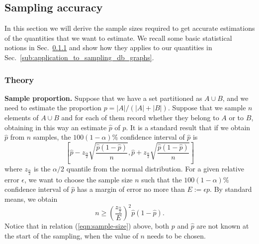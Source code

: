 \documentclass[a4paper,11pt]{article}
\newcommand{\alex}[1]{{\color{blue}{#1}}}
\begin{document}
\subsection{Sampling accuracy}

In this section we will derive the sample sizes required to get accurate estimations of the quantities that we want to estimate. We recall some basic statistical notions in Sec.~\ref{ssub:theory} and show how they applies to our quantities in Sec.~\ref{sub:application_to_sampling_db_graphs}. 



\subsubsection{Theory} %
\label{ssub:theory}



\textbf{Sample proportion.} Suppose that we have a set partitioned as $A \cup B$, and we need to estimate the proportion $p = |A| / (|A| + |B|)$. Suppose that we sample $n$ elements of $A \cup B$ and for each of them record whether they belong to $A$ or to $B$, obtaining in this way an estimate $\hat{p}$ of $p$. It is a standard result that if we obtain $\hat{p}$ from $n$ samples, the $100(1-\alpha)\%$ confidence interval of $\hat{p}$ is
\[\left[\hat{p} - z_{\frac{\alpha}{2}}\sqrt{\frac{\hat{p}(1-\hat{p})}{n}} , \hat{p} + z_{\frac{\alpha}{2}}\sqrt{\frac{\hat{p}(1-\hat{p})}{n}}\right] \]
where $z_{\frac{\alpha}{2}}$ is the $\alpha/2$ quantile from the normal distribution. For a given relative error $\epsilon$, we want to choose the sample size $n$ such that the $100(1-\alpha)\%$ confidence interval of $\hat{p}$ has a margin of error no more than $E := \epsilon p$. By standard means, we obtain
\begin{equation}
	n \geq \left(\frac{z_{\frac{\alpha}{2}}}{E}\right)^2\hat{p}(1-\hat{p}).
	\label{eqn:sample-size}
\end{equation}
Notice that in relation (\ref{eqn:sample-size}) above, both $p$ and $\hat{p}$ are not known at the start of the sampling, when the value of $n$ needs to be chosen. \alex{In our case, we choose ...  }



\end{document}
